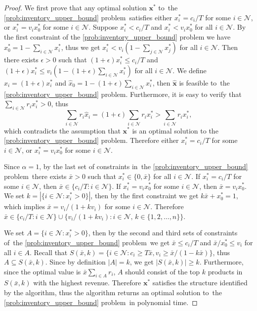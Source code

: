 \documentclass[mnsc,non-blindrev]{informs3}
\theoremstyle{definition}
\begin{document}
\begin{appendices}{\Large{}}
\begin{proof}
We first prove that any optimal solution $\bm{x}^*$ to~the \ref{prob:inventory_upper_bound} problem~satisfies either $x_i^*=c_i/T$ for some $i\in\mathcal{N}$, or $x_i^*=v_ix_0^*$ for some $i\in\mathcal{N}$. Suppose $x_i^*<c_i/T$ and $x_i^*<v_ix_0^*$ for all $i\in\mathcal{N}$. By the first constraint of the \ref{prob:inventory_upper_bound} problem we have $x_0^*=1-\sum_{i\in\mathcal{N}}x_i^*$, thus we get $x_i^*<v_i(1-\sum_{j\in\mathcal{N}}x_j^*)$ for all $i\in\mathcal{N}$. Then there exists $\epsilon>0$ such that $(1+\epsilon)x_i^*\leq c_i/T$ and $(1+\epsilon)x_i^*\leq v_i(1-(1+\epsilon)\sum_{i\in\mathcal{N}}x_i^*)$ for all $i\in\mathcal{N}$. We define $\hat{x}_i=(1+\epsilon)x_i^*$ and $\hat{x}_0=1-(1+\epsilon)\sum_{i\in\mathcal{N}}x_i^*$, then $\hat{\bm{x}}$ is feasible to~the \ref{prob:inventory_upper_bound} problem. Furthermore, it is easy to verify that $\sum_{i\in\mathcal{N}}r_ix_i^*>0$, thus
\begin{equation*}
\sum_{i\in\mathcal{N}}r_i\hat{x}_i=(1+\epsilon)\sum_{i\in\mathcal{N}}r_ix_i^*>\sum_{i\in\mathcal{N}}r_ix_i^*,
\end{equation*}
which contradicts the assumption that $\bm{x}^*$ is an optimal solution to the \ref{prob:inventory_upper_bound} problem. Therefore either $x_i^*=c_i/T$ for some $i\in\mathcal{N}$, or $x_i^*=v_ix_0^*$ for some $i\in\mathcal{N}$.

Since $\alpha=1$, by the last set of constraints in~the \ref{prob:inventory_upper_bound} problem~there exists $\bar{x}>0$ such that $x_i^*\in\{0,\bar{x}\}$ for all $i\in\mathcal{N}$. If $x_i^*=c_i/T$ for some $i\in\mathcal{N}$, then $\bar{x}\in\{c_i/T:i\in\mathcal{N}\}$. If $x_i^*=v_ix_0^*$ for some $i\in\mathcal{N}$, then $\bar{x}=v_ix_0^*$. We set $k=|\{i\in\mathcal{N}:x_i^*>0\}|$, then by the first constraint we get $k\bar{x}+x_0^*=1$, which implies $\bar{x}=v_i/(1+kv_i)$ for some $i\in\mathcal{N}$. Therefore $\bar{x}\in \{c_i/T:i\in\mathcal{N}\}\cup\{v_i/(1+kv_i):i\in\mathcal{N},\,k\in\{1,2,\dots,n\}\}$.

We set $A=\{i\in\mathcal{N}:x_i^*>0\}$, then by the second and third sets of constraints of~the \ref{prob:inventory_upper_bound} problem~we get $\bar{x}\leq c_i/T$ and $\bar{x}/x_0^*\leq v_i$ for all $i\in A$. Recall that \mbox{$S(\bar{x},k)=\{i\in\mathcal{N}:c_i\geq T\bar{x},v_i\geq \bar{x}/(1-k\bar{x})\}$,} thus $A\subseteq S(\bar{x},k)$. Since by definition $|A|=k$, we get $|S(\bar{x},k)|\geq k$. Furthermore, since the optimal value is $\bar{x}\sum_{i\in A}r_i$, $A$ should consist of the top $k$ products in $S(\bar{x},k)$ with the highest revenue. Therefore $\bm{x}^*$ satisfies the structure identified by the algorithm, thus the algorithm returns an optimal solution to~the \ref{prob:inventory_upper_bound} problem~in polynomial time.
\end{proof}


\end{appendices}
\end{document}
